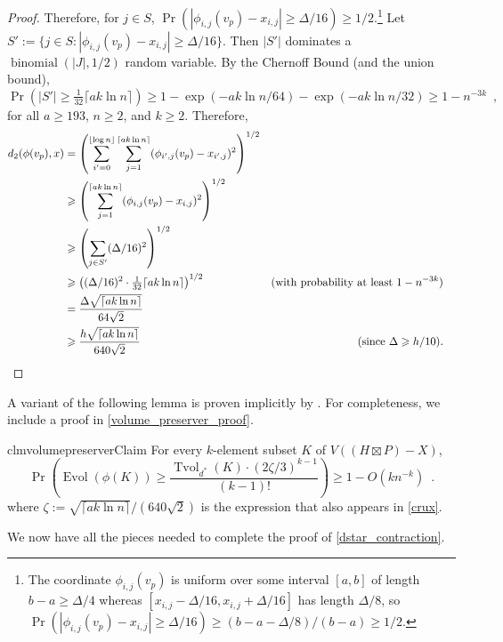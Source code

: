 \documentclass{patmorin}
\renewcommand{\ge}{\geqslant}
\DeclareMathOperator{\evol}{Evol}
\DeclareMathOperator{\tvol}{Tvol}
\begin{document}
\begin{proof}
  Therefore, for $j\in S$, $\Pr(|\phi_{i,j}(v_p)-x_{i,j}|\ge \Delta/16)\ge 1/2$.\footnote{The coordinate $\phi_{i,j}(v_p)$ is uniform over some interval $[a,b]$ of length $b-a\ge \Delta/4$ whereas $[x_{i,j}-\Delta/16,x_{i,j}+\Delta/16]$ has length $\Delta/8$, so $\Pr(|\phi_{i,j}(v_p)-x_{i,j}|\ge \Delta/16)\ge (b-a-\Delta/8)/(b-a)\ge 1/2$.}
  Let $S':=\{j\in S:  |\phi_{i,j}(v_p)-x_{i,j}|\ge \Delta/16\}$.  Then $|S'|$ dominates a $\operatorname{binomial}(|J|,1/2)$ random variable.  By the Chernoff Bound (and the union bound),
  \[
    \Pr(|S'|\ge \tfrac{1}{32}\lceil a k\ln n\rceil)\ge 1-\exp(-ak\ln n/64)-\exp(-ak\ln n/32)\ge 1-n^{-3k} \enspace ,
  \]
  for all $a\ge 193$, $n\ge 2$, and $k\ge 2$.
  Therefore,
  \begin{align*}
    d_2(\phi(v_p),x)
    & = \left(\sum_{i'=0}^{\lfloor\log n\rfloor}\sum_{j=1}^{\lceil ak\ln  n\rceil}(\phi_{i',j}(v_p)-x_{i',j})^2\right)^{1/2} \\
    & \ge \left(\sum_{j=1}^{\lceil ak\ln  n\rceil}(\phi_{i,j}(v_p)-x_{i,j})^2\right)^{1/2} \\
    & \ge \left(\sum_{j\in S'}(\Delta/16)^2\right)^{1/2} \\
    & \ge \left((\Delta/16)^2\cdot \tfrac{1}{32}\lceil ak\ln  n\rceil\right)^{1/2}
      & \text{(with probability at least $1-n^{-3k}$)} \\
    & = \frac{\Delta\sqrt{\lceil ak\ln n\rceil}}{64\sqrt{2}} \\
    & \ge \frac{h\sqrt{\lceil ak\ln n\rceil}}{640\sqrt{2}}
     & \text{(since $\Delta\ge h/10$)}. &
    \qedhere
  \end{align*}
\end{proof}

A variant of the following lemma is proven implicitly by \citet[Pages~529--530]{feige:approximating}.  For completeness, we include a proof in \cref{volume_preserver_proof}.

\begin{restatable}{clm}{volumepreserverClaim}
\label{volume_preserver}
  For every $k$-element subset $K$ of $V((H\boxtimes P)-X)$,
  \[
    \Pr\left(\evol(\phi(K)) \ge \frac{\tvol_{d^*}(K)\cdot(2\zeta/3)^{k-1}}{(k-1)!}\right) \ge 1- O(kn^{-k}) \enspace .
  \]
  where $\zeta:=\sqrt{\lceil ak\ln n\rceil}/(640\sqrt{2})$ is the expression that also appears in \cref{crux}.
\end{restatable}

We now have all the pieces needed to complete the proof of \cref{dstar_contraction}.
\end{document}
